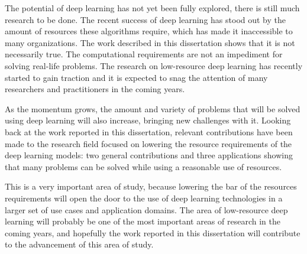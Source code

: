 The potential of deep learning has not yet been fully explored, there is still much research to be done. The recent success of deep learning has stood out by the amount of resources these algorithms require, which has made it inaccessible to many organizations. The work described in this dissertation shows that it is not necessarily true. The computational requirements are not an impediment for solving real-life problems. The research on low-resource deep learning has recently started to gain traction and it is expected to snag the attention of many researchers and practitioners in the coming years. 

As the momentum grows, the amount and variety of problems that will be solved using deep learning will also increase, bringing new challenges with it. Looking back at the work reported in this dissertation, relevant contributions have been made to the research field focused on lowering the resource requirements of the deep learning models: two general contributions and three applications showing that many problems can be solved while using a reasonable use of resources. 

This is a very important area of study, because lowering the bar of the resources requirements will open the door to the use of deep learning technologies in a larger set of use cases and application domains.  The area of low-resource deep learning will probably be one of the most important areas of research in the coming years, and hopefully the work reported in this dissertation will contribute to the advancement of this area of study.

